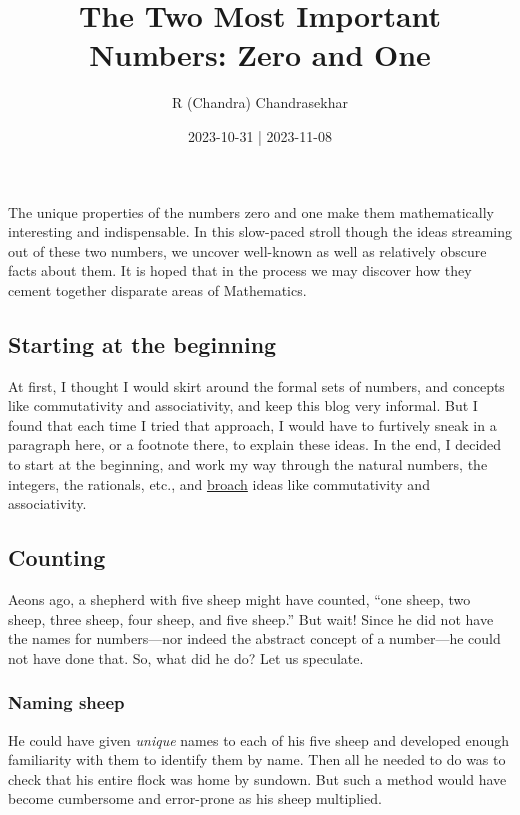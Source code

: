 \documentclass[
  a4paper,
]{article}
\title{The Two Most Important Numbers: Zero and One}
\author{R (Chandra) Chandrasekhar}
\date{2023-10-31 | 2023-11-08}
\begin{document}
\maketitle

\thispagestyle{empty}


The unique properties of the numbers zero and one make them
mathematically interesting and indispensable. In this slow-paced stroll
though the ideas streaming out of these two numbers, we uncover
well-known as well as relatively obscure facts about them. It is hoped
that in the process we may discover how they cement together disparate
areas of Mathematics.

\hypertarget{starting-at-the-beginning}{%
\subsection{Starting at the beginning}\label{starting-at-the-beginning}}

At first, I thought I would skirt around the formal sets of numbers, and
concepts like commutativity and associativity, and keep this blog very
informal. But I found that each time I tried that approach, I would have
to furtively sneak in a paragraph here, or a footnote there, to explain
these ideas. In the end, I decided to start at the beginning, and work
my way through the natural numbers, the integers, the rationals, etc.,
and \href{https://www.thefreedictionary.com/broach}{broach} ideas like
commutativity and associativity.

\hypertarget{counting}{%
\subsection{Counting}\label{counting}}

Aeons ago, a shepherd with five sheep might have counted, ``one sheep,
two sheep, three sheep, four sheep, and five sheep.'' But wait! Since he
did not have the names for numbers---nor indeed the abstract concept of
a number---he could not have done that. So, what did he do? Let us
speculate.

\hypertarget{naming-sheep}{%
\subsubsection{Naming sheep}\label{naming-sheep}}

He could have given \emph{unique} names to each of his five sheep and
developed enough familiarity with them to identify them by name. Then
all he needed to do was to check that his entire flock was home by
sundown. But such a method would have become cumbersome and error-prone
as his sheep multiplied.
\end{document}
